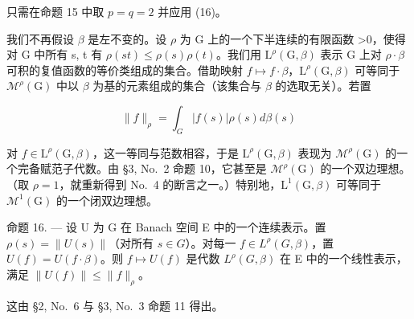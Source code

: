 只需在命题 15 中取 \(p = q = 2\) 并应用 (16)。

我们不再假设 \(\beta\) 是左不变的。设 \(\rho\) 为 G 上的一个下半连续的有限函数 \textgreater0，使得对 G 中所有 s, t 有 \(\rho(st) \leqslant \rho(s)\rho(t)\)。我们用 \(\mathrm{L}^{\rho}(\mathrm{G}, \beta)\) 表示 G 上对 \(\rho \cdot \beta\) 可积的复值函数的等价类组成的集合。借助映射 \(f \mapsto f \cdot \beta\)，\(\mathrm{L}^{\rho}(\mathrm{G}, \beta)\) 可等同于 \(\mathcal{M}^{\rho}(\mathrm{G})\) 中以 \(\beta\) 为基的元素组成的集合（该集合与 \(\beta\) 的选取无关）。若置

\[
\| f \| _ {\rho} = \int_ {G} | f (s) | \rho (s) d \beta (s)
\]

对 \(f \in \mathrm{L}^{\rho}(\mathrm{G},\beta)\)，这一等同与范数相容，于是 \(\mathrm{L}^{\rho}(\mathrm{G},\beta)\) 表现为 \(\mathcal{M}^{\rho}(\mathrm{G})\) 的一个完备赋范子代数。由 §3, No.~2 命题 10，它甚至是 \(\mathcal{M}^{\rho}(\mathrm{G})\) 的一个双边理想。（取 \(\rho = 1\)，就重新得到 No.~4 的断言之一。）特别地，\(\mathrm{L}^{1}(\mathrm{G},\beta)\) 可等同于 \(\mathcal{M}^{1}(\mathrm{G})\) 的一个闭双边理想。

命题 16. --- 设 U 为 G 在 Banach 空间 E 中的一个连续表示。置 \(\rho(s) = \|U(s)\|\)（对所有 \(s \in G\)）。对每一 \(f \in L^{\rho}(G, \beta)\)，置 \(U(f) = U(f \cdot \beta)\)。则 \(f \mapsto U(f)\) 是代数 \(L^{\rho}(G, \beta)\) 在 E 中的一个线性表示，满足 \(\|U(f)\| \leqslant \|f\|_{\rho}\)。

这由 §2, No.~6 与 §3, No.~3 命题 11 得出。

